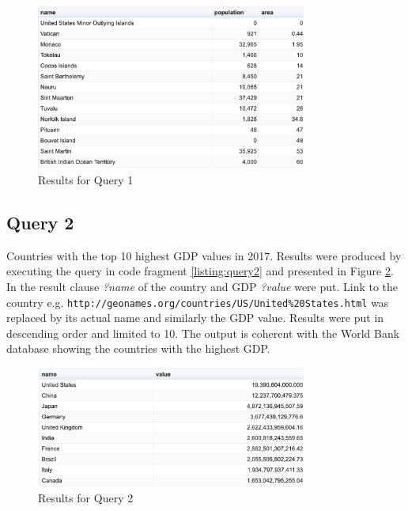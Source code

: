\documentclass[11pt]{article}
\begin{document}
\begin{figure}[H]
  \centering
   \includegraphics[width=0.8\textwidth]{results/Q1.png}
  \caption{Results for Query 1}
  \label{fig:q1}
\end{figure}

\subsection{Query 2\label{subsec:query2}} 
Countries with the top 10 highest GDP values in 2017. Results were produced by executing the query in code fragment \ref{listing:query2} and presented in Figure \ref{fig:q2}. In the result clause \textit{?name} of the country and GDP \textit{?value} were put. Link to the country e.g. {\small\texttt{http://geonames.org/countries/US/United\%20States.html}} was replaced by its actual name and similarly the GDP value. Results were put in descending order and limited to 10. The output is coherent with the World Bank database showing the countries with the highest GDP.

\begin{figure}[H]
  \centering
   \includegraphics[width=0.8\textwidth]{results/Q2.png}
  \caption{Results for Query 2}
  \label{fig:q2}
\end{figure}
\end{document}
